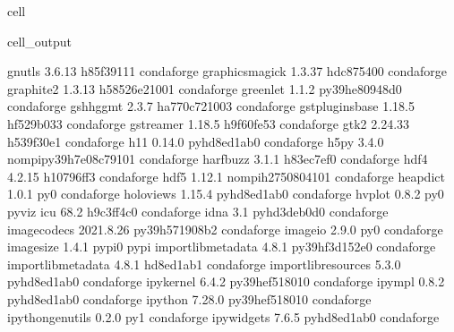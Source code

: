 \documentclass[letterpaper,table,10pt,english]{jupyterBook}
\begin{document}
\begin{sphinxuseclass}{cell}
\begin{sphinxVerbatimOutput}
\begin{sphinxuseclass}{cell_output}
\begin{sphinxVerbatim}[commandchars=\\\{\}]
gnutls                    3.6.13               h85f3911\PYGZus{}1    conda\PYGZhy{}forge
graphicsmagick            1.3.37               hdc87540\PYGZus{}0    conda\PYGZhy{}forge
graphite2                 1.3.13            h58526e2\PYGZus{}1001    conda\PYGZhy{}forge
greenlet                  1.1.2            py39he80948d\PYGZus{}0    conda\PYGZhy{}forge
gshhg\PYGZhy{}gmt                 2.3.7             ha770c72\PYGZus{}1003    conda\PYGZhy{}forge
gst\PYGZhy{}plugins\PYGZhy{}base          1.18.5               hf529b03\PYGZus{}3    conda\PYGZhy{}forge
gstreamer                 1.18.5               h9f60fe5\PYGZus{}3    conda\PYGZhy{}forge
gtk2                      2.24.33              h539f30e\PYGZus{}1    conda\PYGZhy{}forge
h11                       0.14.0             pyhd8ed1ab\PYGZus{}0    conda\PYGZhy{}forge
h5py                      3.4.0           nompi\PYGZus{}py39h7e08c79\PYGZus{}101    conda\PYGZhy{}forge
harfbuzz                  3.1.1                h83ec7ef\PYGZus{}0    conda\PYGZhy{}forge
hdf4                      4.2.15               h10796ff\PYGZus{}3    conda\PYGZhy{}forge
hdf5                      1.12.1          nompi\PYGZus{}h2750804\PYGZus{}101    conda\PYGZhy{}forge
heapdict                  1.0.1                      py\PYGZus{}0    conda\PYGZhy{}forge
holoviews                 1.15.4             pyhd8ed1ab\PYGZus{}0    conda\PYGZhy{}forge
hvplot                    0.8.2                      py\PYGZus{}0    pyviz
icu                       68.2                 h9c3ff4c\PYGZus{}0    conda\PYGZhy{}forge
idna                      3.1                pyhd3deb0d\PYGZus{}0    conda\PYGZhy{}forge
imagecodecs               2021.8.26        py39h571908b\PYGZus{}2    conda\PYGZhy{}forge
imageio                   2.9.0                      py\PYGZus{}0    conda\PYGZhy{}forge
imagesize                 1.4.1                    pypi\PYGZus{}0    pypi
importlib\PYGZhy{}metadata        4.8.1            py39hf3d152e\PYGZus{}0    conda\PYGZhy{}forge
importlib\PYGZus{}metadata        4.8.1                hd8ed1ab\PYGZus{}1    conda\PYGZhy{}forge
importlib\PYGZus{}resources       5.3.0              pyhd8ed1ab\PYGZus{}0    conda\PYGZhy{}forge
ipykernel                 6.4.2            py39hef51801\PYGZus{}0    conda\PYGZhy{}forge
ipympl                    0.8.2              pyhd8ed1ab\PYGZus{}0    conda\PYGZhy{}forge
ipython                   7.28.0           py39hef51801\PYGZus{}0    conda\PYGZhy{}forge
ipython\PYGZus{}genutils          0.2.0                      py\PYGZus{}1    conda\PYGZhy{}forge
ipywidgets                7.6.5              pyhd8ed1ab\PYGZus{}0    conda\PYGZhy{}forge

\end{sphinxVerbatim}
\end{sphinxuseclass}
\end{sphinxVerbatimOutput}
\end{sphinxuseclass}
\end{document}
